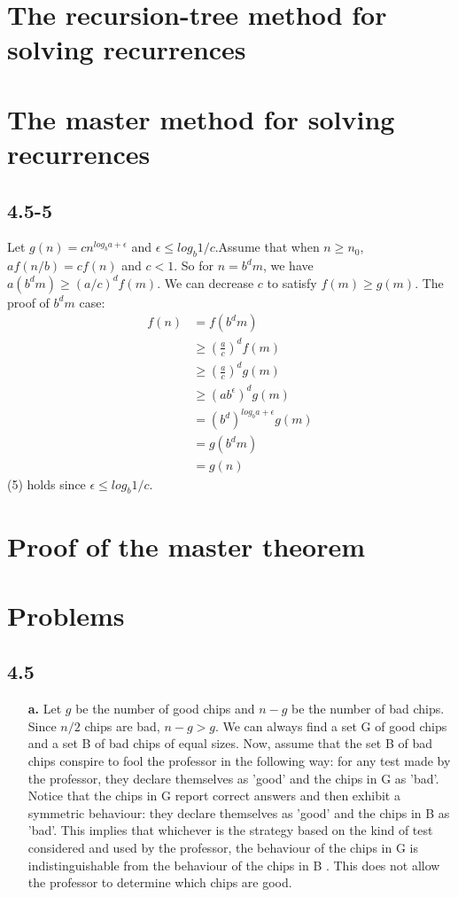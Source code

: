 \documentclass{book}
\begin{document}
\begin{CJK}{UTF8}{gkai}
\section{The recursion-tree method for solving recurrences}
\section{The master method for solving recurrences}

\subsection*{4.5-5}
Let $g(n) = cn^{log_b a + \epsilon}$ and $\epsilon \le log_b 1/c$.Assume that 
when $n\ge n_0$, $af(n/b)=cf(n)$ and $c<1$. So for $n=b^dm$, we have $a(b^dm) 
\ge (a/c)^d f(m)$. We can decrease $c$ to satisfy $f(m) \ge g(m)$. The proof of 
$b^dm$ case:
\begin{align}
f(n) &= f(b^dm) \\
& \ge (\frac{a}{c})^d f(m) \\
& \ge (\frac{a}{c})^d g(m) \\
& \ge (ab^\epsilon)^d g(m) \\
& = (b^d)^{log_b a + \epsilon} g(m) \\
& = g(b^dm) \\
& = g(n)
\end{align}
(5) holds since $\epsilon \le log_b 1/c$.

\section{Proof of the master theorem}
\section{Problems}

\subsection*{4.5}
\begin{flushleft}
\begin{itemize}
\item[\textbf{a.}] Let $g$ be the number of good chips and $n-g$ be the number 
of bad chips. Since $n/2$ chips are bad, $n-g > g$. We can always find a set G 
of good chips and a set B of bad chips of equal sizes.  Now, assume that the set 
B of bad chips conspire to fool the professor in the following way: for any test 
made by the professor, they declare themselves as 'good' and the chips in G as 
'bad'.  Notice that the chips in G report correct answers and then exhibit a 
symmetric behaviour: they declare themselves as 'good' and the chips in B as 
'bad'. This implies that whichever is the strategy based on the kind of test 
considered and used by the professor, the behaviour of the chips in G is 
indistinguishable from the behaviour of the chips in B . This does not allow the 
professor to determine which chips are good.


\end{itemize}
\end{flushleft}
\end{CJK}
\end{document}
